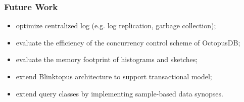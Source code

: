 \documentclass{beamer}
\begin{document}
\begin{frame}
\frametitle{Future Work}
\begin{itemize}
\item{optimize centralized log (e.g. log replication, garbage collection);} \pause
\item{evaluate the efficiency of the concurrency control scheme of OctopusDB;} \pause
\item{evaluate the memory footprint of histograms and sketches;} \pause
\item{extend Blinktopus architecture to support transactional model;} \pause
\item{extend query classes by implementing sample-based data synopses.}
\end{itemize}
\end{frame}
\end{document}
